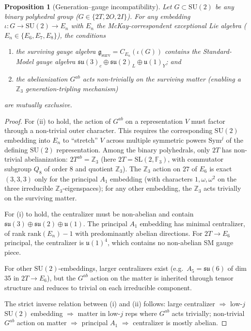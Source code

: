 \documentclass[11pt,a4paper]{amsart}
\newtheorem{proposition}[theorem]{Proposition}
\theoremstyle{definition}
\theoremstyle{remark}
\newcommand{\SU}{\mathrm{SU}}
\newcommand{\SL}{\mathrm{SL}}
\newcommand{\Sym}{\mathrm{Sym}}
\newcommand{\rank}{\mathrm{rank}}
\newcommand{\bbZ}{\mathbb{Z}}
\newcommand{\bbF}{\mathbb{F}}
\newcommand{\frakg}{\mathfrak{g}}
\newcommand{\fraks}{\mathfrak{s}}
\newcommand{\fraku}{\mathfrak{u}}
\begin{document}
\begin{proposition}[Generation--gauge incompatibility]\label{thm:gen-gauge}
Let $G \subset \SU(2)$ be any binary polyhedral group ($G \in \{2T, 2O, 2I\}$).
For any embedding $\iota: G \to \SU(2) \to E_n$ with $E_n$ the McKay-correspondent
exceptional Lie algebra ($E_n \in \{E_6, E_7, E_8\}$), the conditions
\begin{enumerate}[label=(\roman*)]
  \item the surviving gauge algebra
        $\frakg_{\mathrm{surv}} = C_{E_n}(\iota(G))$ contains the
        Standard-Model gauge algebra $\fraks\fraku(3)_c \oplus \fraks\fraku(2)_L \oplus \fraku(1)_Y$;
        and
  \item the abelianization $G^{ab}$ acts non-trivially on the surviving
        matter (enabling a $\bbZ_3$ generation-tripling mechanism)
\end{enumerate}
are mutually exclusive.
\end{proposition}

\begin{proof}
For (ii) to hold, the action of $G^{ab}$ on a representation $V$ must factor
through a non-trivial outer character. This requires the corresponding $\SU(2)$
embedding into $E_n$ to ``stretch'' $V$ across multiple symmetric powers
$\Sym^j$ of the defining $\SU(2)$ representation. Among the binary polyhedrals,
only $2T$ has non-trivial abelianization: $2T^{ab} = \bbZ_3$
(here $2T = \SL(2, \bbF_3)$, with commutator subgroup $Q_8$ of order 8 and
quotient $\bbZ_3$). The $\bbZ_3$ action on $27$ of $E_6$ is exact $(3,3,3)$
only for the principal $A_1$ embedding (with characters $1, \omega, \omega^2$
on the three irreducible $\bbZ_3$-eigenspaces); for any other embedding,
the $\bbZ_3$ acts trivially on the surviving matter.

For (i) to hold, the centralizer must be non-abelian and contain
$\fraks\fraku(3) \oplus \fraks\fraku(2) \oplus \fraku(1)$. The principal $A_1$
embedding has minimal centralizer, of rank $\rank(E_n) - 1$ with predominantly
abelian directions. For $2T \to E_6$ principal, the centralizer is $\fraku(1)^4$,
which contains no non-abelian SM gauge piece.

For other $\SU(2)$-embeddings, larger centralizers exist (e.g.\ $A_5 = \fraks\fraku(6)$
of dim 35 in $2T \to E_6$), but the $G^{ab}$ action on the matter is inherited
through tensor structure and reduces to trivial on each irreducible component.

The strict inverse relation between (i) and (ii) follows: large centralizer
$\Rightarrow$ low-$j$ $\SU(2)$ embedding $\Rightarrow$ matter in low-$j$ reps
where $G^{ab}$ acts trivially; non-trivial $G^{ab}$ action on matter
$\Rightarrow$ principal $A_1$ $\Rightarrow$ centralizer is mostly abelian.
\end{proof}
\end{document}
